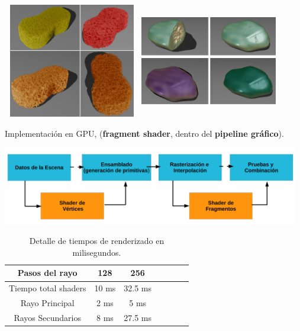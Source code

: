 \documentclass[spanish,unknownkeysallowed,10pt]{beamer}
\begin{document}
\begin{frame}{}

\includegraphics[width=6cm, height=5cm]{../figures/Fig13CAVW}
\includegraphics[width=6cm, height=5cm]{../figures/Fig14CAVW}

\end{frame}

\begin{frame}
Implementación en GPU, (\textbf{fragment shader}, dentro del \textbf{pipeline gráfico}).

\centerline{\includegraphics[width=13cm]{../figures/pipelinegrafico}}

\begin{table}[htb]
\centering

\begin{tabular}{|c|c|c|c|c|c|c|}
\hline
 Pasos del rayo         & 128 &  256 \\
\hline
\hline
 Tiempo total shaders   & 10 ms &  32.5 ms \\
\hline
 Rayo Principal         & 2 ms  & 5 ms  \\
\hline
 Rayos Secundarios      &  8 ms & 27.5 ms  \\
\hline
\end{tabular}
\caption{Detalle de tiempos de renderizado en milisegundos.}
\label{tab:n2}
\end{table}


\end{frame}
\end{document}
